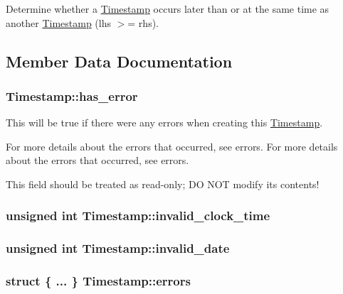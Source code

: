 Determine whether a \hyperlink{structTimestamp}{Timestamp} occurs later than or at the same time as another \hyperlink{structTimestamp}{Timestamp} (lhs $>$= rhs). 



\subsection{Member Data Documentation}
\hypertarget{structTimestamp_a7e49819ae41a46b5cae479d9ddbc3bdf}{
\subsubsection[{has\-\_\-error}]{ Timestamp\-::has\-\_\-error}}\label{structTimestamp_a7e49819ae41a46b5cae479d9ddbc3bdf}


This will be true if there were any errors when creating this \hyperlink{structTimestamp}{Timestamp}. 

For more details about the errors that occurred, see {\ttfamily errors}. For more details about the errors that occurred, see {\ttfamily errors}.

This field should be treated as read-\/only; D\-O N\-O\-T modify its contents! \hypertarget{structTimestamp_ad56711d7488c95189fd4635590b8adef}{
\subsubsection[{invalid\-\_\-clock\-\_\-time}]{\setlength{\rightskip}{0pt plus 5cm}unsigned int Timestamp\-::invalid\-\_\-clock\-\_\-time}}\label{structTimestamp_ad56711d7488c95189fd4635590b8adef}
\hypertarget{structTimestamp_ae74e1930abf6be5d7dfe552710c87899}{
\subsubsection[{invalid\-\_\-date}]{\setlength{\rightskip}{0pt plus 5cm}unsigned int Timestamp\-::invalid\-\_\-date}}\label{structTimestamp_ae74e1930abf6be5d7dfe552710c87899}
\hypertarget{structTimestamp_abafff530b3a467c1dcc27b780f89d0a0}{
\subsubsection[{errors}]{\setlength{\rightskip}{0pt plus 5cm}struct \{ ... \}   Timestamp\-::errors}}\label{structTimestamp_abafff530b3a467c1dcc27b780f89d0a0}


